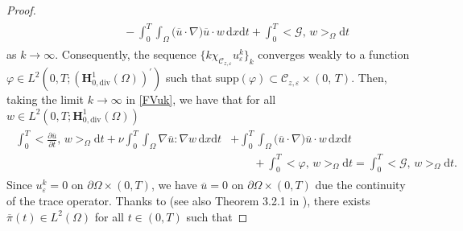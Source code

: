 \documentclass[a4paper,12pt,reqno,natbib]{amsart}
\newcommand{\dx} {\displaystyle\mathrm{d}x}
\newcommand{\dt} {\displaystyle\mathrm{d}t}
\def\H{\textbf{H}}
\def\div{\text{div}}
\begin{document}
\begin{proof}
\begin{align}
\begin{split}
    &\qquad\qquad-\int_0^T\int_\Omega\big(\overline{u}\cdot\nabla \big)\overline{u}\cdot w \,\dx\dt +\int_0^T\big<\mathcal{G},\,w \big>_\Omega\dt\end{split}
\end{align}
as $k\longrightarrow\infty.$ Consequently, the sequence $\{k\chi_{\mathcal{C}_{z,\varepsilon}}u_\varepsilon^k\}_k$ converges weakly to a function $\varphi\in L^2(0,T;(\H^1_{0,\div}(\Omega))^\prime)$ such that $\text{supp}(\varphi)\subset\mathcal{C}_{z,\varepsilon}\times(0,\,T).$ Then, taking the limit $k\longrightarrow\infty$ in \eqref{FVuk}, we have that for all $w\in L^2(0,T;\H^1_{0,\div}(\Omega))$
\begin{align}
\begin{split}\label{FVUbar}
    \int_0^T\big<\frac{\partial \overline{u}}{\partial t},\,w \big>_\Omega\dt+\nu\int_0^T\int_\Omega\nabla \overline{u}:\nabla w \,\dx\dt
    &+\int_0^T\int_{\Omega}\big(\overline{u}\cdot\nabla\big) \overline{u}\cdot w \,\dx\dt\\
    &\qquad+   \int_0^T\big<\varphi,\,w \big>_\Omega\dt=\int_0^T\big<\mathcal{G},\,w \big>_\Omega\dt.
    \end{split}
\end{align}
Since $u_\varepsilon^k=0$ on $\partial\Omega\times(0,T)$, we have $\overline{u}=0$ on $\partial\Omega\times(0,T)$ due the continuity of the trace operator. Thanks to \cite[Proposition I.1.3]{temam1973theory} (see also Theorem 3.2.1 in \cite{pokorny2022navier}), there exists $\overline{\pi}(t)\in L^2(\Omega)$ for all $t\in(0,T)$ such that


\end{proof}
\end{document}

